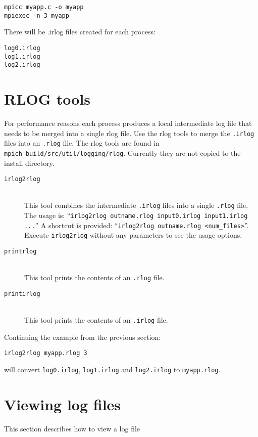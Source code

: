 \documentclass[dvipdfm,11pt]{article}
\begin{document}
\begin{verbatim}
mpicc myapp.c -o myapp
mpiexec -n 3 myapp
\end{verbatim}
There will be .irlog files created for each process:
\begin{verbatim}
log0.irlog
log1.irlog
log2.irlog
\end{verbatim}

\section{RLOG tools}
\label{sec:tools}
For performance reasons each process produces a local intermediate log file 
that needs to be merged into a single rlog file.  Use the rlog tools to merge 
the \texttt{.irlog} files into an \texttt{.rlog} file.  The rlog tools are 
found in \texttt{mpich\_build/src/util/logging/rlog}. Currently they are not 
copied to the install directory.

\begin{description}
\item[\texttt{irlog2rlog}]\mbox{}\\
This tool combines the intermediate \texttt{.irlog} files into a single 
\texttt{.rlog} file. The usage is: ``\texttt{irlog2rlog outname.rlog 
input0.irlog input1.irlog ...}'' A shortcut is provided: ``\texttt{irlog2rlog 
outname.rlog <num\_files>}''.  Execute \texttt{irlog2rlog} without any 
parameters to see the usage options.

\item[\texttt{printrlog}]\mbox{}\\
This tool prints the contents of an \texttt{.rlog} file.

\item[\texttt{printirlog}]\mbox{}\\
This tool prints the contents of an \texttt{.irlog} file.
\end{description}

Continuing the example from the previous section:
\begin{verbatim}
irlog2rlog myapp.rlog 3
\end{verbatim}
will convert \texttt{log0.irlog}, \texttt{log1.irlog} and \texttt{log2.irlog} 
to \texttt{myapp.rlog}.

\section{Viewing log files}
This section describes how to view a log file
\end{document}
